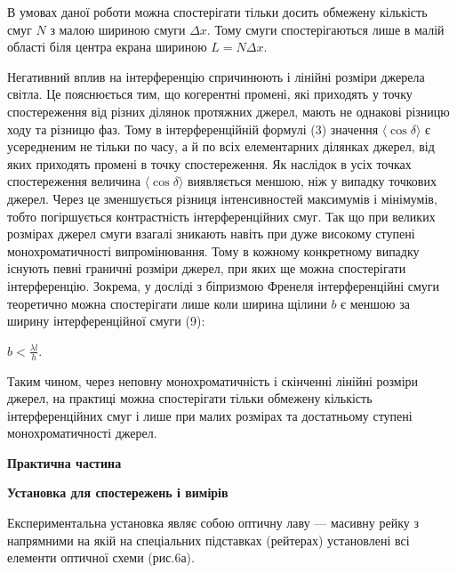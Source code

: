 \documentclass[12pt,a4paper]{article}
\begin{document}
    В умовах даної роботи можна спостерігати тільки досить обмежену кількість
    смуг $N$ з малою шириною смуги $\Delta x$. Тому смуги спостерігаються лише в
    малій області біля центра екрана шириною $L = N\Delta x$.

    Негативний вплив на інтерференцію спричинюють і лінійні розміри
    джерела світла. Це пояснюється тим, що когерентні промені, які приходять у
    точку спостереження від різних ділянок протяжних джерел, мають не однакові різницю
    ходу та різницю фаз. Тому в інтерференційній формулі (3) значення
    $\langle \cos \delta \rangle$ є усередненим не тільки по часу, а й по всіх елементарних
    ділянках джерел, від яких приходять промені в точку спостереження.
    Як наслідок в усіх точках спостереження величина $\langle \cos \delta \rangle$ виявляється меншою, ніж
    у випадку точкових джерел. Через це зменшується різниця інтенсивностей
    максимумів і мінімумів, тобто погіршується контрастність інтерференційних
    смуг. Так що при великих розмірах джерел смуги взагалі зникають навіть при
    дуже високому ступені монохроматичності випромінювання. Тому в кожному конкретному
    випадку існують певні граничні розміри джерел, при яких ще можна спостерігати
    інтерференцію. Зокрема, у досліді з біпризмою Френеля інтерференційні смуги теоретично
    можна спостерігати лише коли ширина щілини $b$ є меншою за ширину інтерференційної смуги (9):

    \begin{center}
        $\displaystyle b < \frac{\lambda l}{h}$.
    \end{center}

    Таким чином, через неповну монохроматичність і скінченні лінійні
    розміри джерел, на практиці можна спостерігати тільки обмежену кількість
    інтерференційних смуг і лише при малих розмірах та достатньому ступені
    монохроматичності джерел.

    \newpage

    \begin{center}
        \textbf{\Large Практична частина}
    \end{center}

    \begin{center} \textbf{Установка для спостережень і вимірів} \end{center}

    Експериментальна установка являє собою оптичну лаву --- масивну рейку з напрямними
    на якій на спеціальних підставках (рейтерах) установлені всі елементи оптичної схеми
    (рис.6а).
\end{document}
